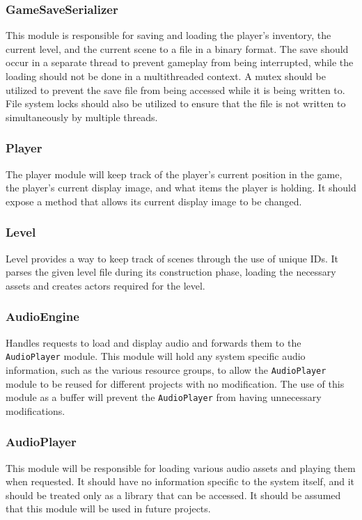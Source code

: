 \documentclass{article}
\begin{document}
    \subsubsection{GameSaveSerializer}
      This module is responsible for saving and loading the player's inventory, the current level, and the current scene to a file in a binary format. The save should occur in a separate thread to prevent gameplay from being interrupted, while the loading should not be done in a multithreaded context. A mutex should be utilized to prevent the save file from being accessed while it is being written to. File system locks should also be utilized to ensure that the file is not written to simultaneously by multiple threads.
    \subsubsection{Player}
      The player module will keep track of the player's current position in the game, the player's current display image, and what items the player is holding. It should expose a method that allows its current display image to be changed.
    \subsubsection{Level}
      Level provides a way to keep track of scenes through the use of unique IDs. It parses the given level file during its construction phase, loading the necessary assets and creates actors required for the level.
    \subsubsection{AudioEngine}
      Handles requests to load and display audio and forwards them to the \texttt{AudioPlayer} module. This module will hold any system specific audio information, such as the various resource groups, to allow the \texttt{AudioPlayer} module to be reused for different projects with no modification. The use of this module as a buffer will prevent the \texttt{AudioPlayer} from having unnecessary modifications.
    \subsubsection{AudioPlayer}
      This module will be responsible for loading various audio assets and playing them when requested. It should have no information specific to the system itself, and it should be treated only as a library that can be accessed. It should be assumed that this module will be used in future projects.
\end{document}
